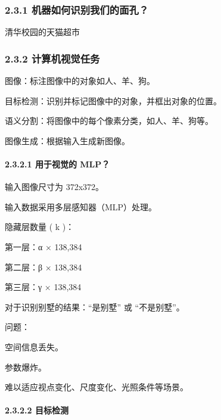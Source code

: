 \subsubsection{\texorpdfstring{\textbf{2.3.1}
\textbf{机器如何识别我们的面孔？}}{2.3.1 机器如何识别我们的面孔？}}\label{231-ux673aux5668ux5982ux4f55ux8bc6ux522bux6211ux4eecux7684ux9762ux5b54}

清华校园的天猫超市


\subsubsection{\texorpdfstring{\textbf{2.3.2}
\textbf{计算机视觉任务}}{2.3.2 计算机视觉任务}}\label{232-ux8ba1ux7b97ux673aux89c6ux89c9ux4efbux52a1}

图像：标注图像中的对象如人、羊、狗。

目标检测：识别并标记图像中的对象，并框出对象的位置。

语义分割：将图像中的每个像素分类，如人、羊、狗等。

图像生成：根据输入生成新图像。

\paragraph{\texorpdfstring{\textbf{2.3.2.1 用于视觉的
MLP？}}{2.3.2.1 用于视觉的 MLP？}}\label{2321-ux7528ux4e8eux89c6ux89c9ux7684-mlp}


输入图像尺寸为 372x372。

输入数据采用多层感知器（MLP）处理。

隐藏层数量 ( k )：

第一层：α × 138,384

第二层：β × 138,384

第三层：γ × 138,384

对于识别别墅的结果：``是别墅'' 或 ``不是别墅''。

问题：

空间信息丢失。

参数爆炸。

难以适应视点变化、尺度变化、光照条件等场景。

\paragraph{\texorpdfstring{\textbf{2.3.2.2
目标检测}}{2.3.2.2 目标检测}}\label{2322-ux76eeux6807ux68c0ux6d4b}

